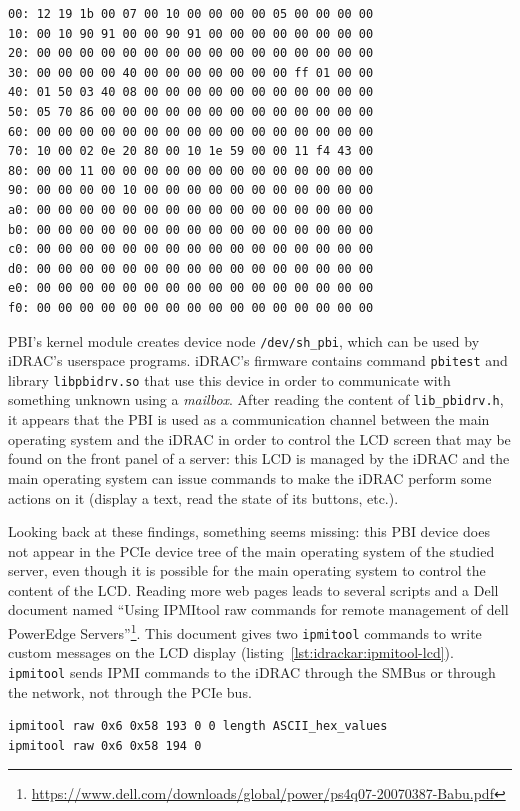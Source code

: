 \begin{lstlisting}[language={},caption={Parsing of PBI's PCIe configuration with \texttt{lspci}.},label={lst:idrackar:lspci-pbi}]
00: 12 19 1b 00 07 00 10 00 00 00 00 05 00 00 00 00
10: 00 10 90 91 00 00 90 91 00 00 00 00 00 00 00 00
20: 00 00 00 00 00 00 00 00 00 00 00 00 00 00 00 00
30: 00 00 00 00 40 00 00 00 00 00 00 00 ff 01 00 00
40: 01 50 03 40 08 00 00 00 00 00 00 00 00 00 00 00
50: 05 70 86 00 00 00 00 00 00 00 00 00 00 00 00 00
60: 00 00 00 00 00 00 00 00 00 00 00 00 00 00 00 00
70: 10 00 02 0e 20 80 00 10 1e 59 00 00 11 f4 43 00
80: 00 00 11 00 00 00 00 00 00 00 00 00 00 00 00 00
90: 00 00 00 00 10 00 00 00 00 00 00 00 00 00 00 00
a0: 00 00 00 00 00 00 00 00 00 00 00 00 00 00 00 00
b0: 00 00 00 00 00 00 00 00 00 00 00 00 00 00 00 00
c0: 00 00 00 00 00 00 00 00 00 00 00 00 00 00 00 00
d0: 00 00 00 00 00 00 00 00 00 00 00 00 00 00 00 00
e0: 00 00 00 00 00 00 00 00 00 00 00 00 00 00 00 00
f0: 00 00 00 00 00 00 00 00 00 00 00 00 00 00 00 00
\end{lstlisting}

PBI's kernel module creates device node \texttt{/dev/sh\_pbi}, which can be used by iDRAC's userspace programs.
iDRAC's firmware contains command \texttt{pbitest} and library \texttt{libpbidrv.so} that use this device in order to communicate with something unknown using a \emph{mailbox}.
After reading the content of \texttt{lib\_pbidrv.h}, it appears that the PBI is used as a communication channel between the main operating system and the iDRAC in order to control the LCD screen that may be found on the front panel of a server: this LCD is managed by the iDRAC and the main operating system can issue commands to make the iDRAC perform some actions on it (display a text, read the state of its buttons, etc.).

Looking back at these findings, something seems missing: this PBI device does not appear in the PCIe device tree of the main operating system of the studied server, even though it is possible for the main operating system to control the content of the LCD.
Reading more web pages leads to several scripts and a Dell document named ``Using IPMItool raw commands for remote management of dell PowerEdge Servers''\footnote{\url{https://www.dell.com/downloads/global/power/ps4q07-20070387-Babu.pdf}}.
This document gives two \texttt{ipmitool} commands to write custom messages on the LCD display (listing~\ref{lst:idrackar:ipmitool-lcd}).
\texttt{ipmitool} sends IPMI commands to the iDRAC through the SMBus or through the network, not through the PCIe bus.

\begin{lstlisting}[language={},caption={Create custom LCD messages with IPMItool.},label={lst:idrackar:ipmitool-lcd}]
ipmitool raw 0x6 0x58 193 0 0 length ASCII_hex_values
ipmitool raw 0x6 0x58 194 0
\end{lstlisting}

